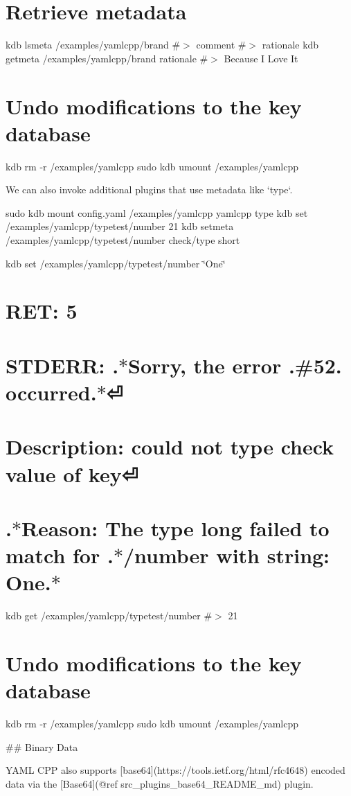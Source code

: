 \section*{Retrieve metadata}

kdb lsmeta /examples/yamlcpp/brand \#$>$ comment \#$>$ rationale kdb getmeta /examples/yamlcpp/brand rationale \#$>$ Because I Love It

\section*{Undo modifications to the key database}

kdb rm -\/r /examples/yamlcpp sudo kdb umount /examples/yamlcpp 
\begin{DoxyCode}
We can also invoke additional plugins that use metadata like `type`.
\end{DoxyCode}
 sudo kdb mount config.\+yaml /examples/yamlcpp yamlcpp type kdb set /examples/yamlcpp/typetest/number 21 kdb setmeta /examples/yamlcpp/typetest/number check/type short

kdb set /examples/yamlcpp/typetest/number \char`\"{}\+One\char`\"{} \section*{R\+ET\+: 5}

\section*{S\+T\+D\+E\+RR\+: .$\ast$\+Sorry, the error .\#52. occurred.$\ast$⏎}

\section*{Description\+: could not type check value of key⏎}

\section*{.$\ast$\+Reason\+: The type long failed to match for .$\ast$/number with string\+: One.$\ast$}

kdb get /examples/yamlcpp/typetest/number \#$>$ 21

\section*{Undo modifications to the key database}

kdb rm -\/r /examples/yamlcpp sudo kdb umount /examples/yamlcpp 
\begin{DoxyCode}
## Binary Data

YAML CPP also supports [base64](https://tools.ietf.org/html/rfc4648) encoded data via the [Base64](@ref
       src\_plugins\_base64\_README\_md) plugin.
\end{DoxyCode}
